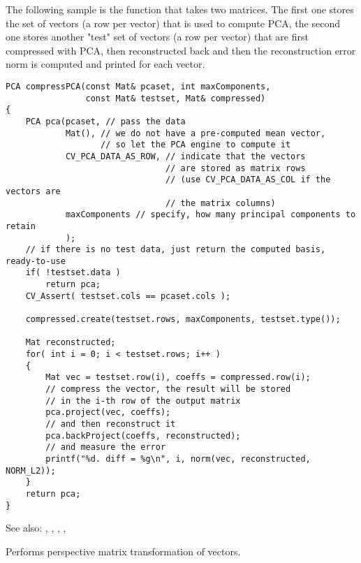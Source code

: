 The following sample is the function that takes two matrices. The first one stores the set of vectors (a row per vector) that is used to compute PCA, the second one stores another "test" set of vectors (a row per vector) that are first compressed with PCA, then reconstructed back and then the reconstruction error norm is computed and printed for each vector.
\begin{lstlisting}
PCA compressPCA(const Mat& pcaset, int maxComponents,
                const Mat& testset, Mat& compressed)
{
    PCA pca(pcaset, // pass the data
            Mat(), // we do not have a pre-computed mean vector,
                   // so let the PCA engine to compute it
            CV_PCA_DATA_AS_ROW, // indicate that the vectors
                                // are stored as matrix rows
                                // (use CV_PCA_DATA_AS_COL if the vectors are
                                // the matrix columns)
            maxComponents // specify, how many principal components to retain
            );
    // if there is no test data, just return the computed basis, ready-to-use
    if( !testset.data )
        return pca;
    CV_Assert( testset.cols == pcaset.cols );

    compressed.create(testset.rows, maxComponents, testset.type());

    Mat reconstructed;
    for( int i = 0; i < testset.rows; i++ )
    {
        Mat vec = testset.row(i), coeffs = compressed.row(i);
        // compress the vector, the result will be stored
        // in the i-th row of the output matrix
        pca.project(vec, coeffs);
        // and then reconstruct it
        pca.backProject(coeffs, reconstructed);
        // and measure the error
        printf("%d. diff = %g\n", i, norm(vec, reconstructed, NORM_L2));
    }
    return pca;
}
\end{lstlisting}

See also: , , , , 

Performs perspective matrix transformation of vectors.

\begin{description}
\end{description}

